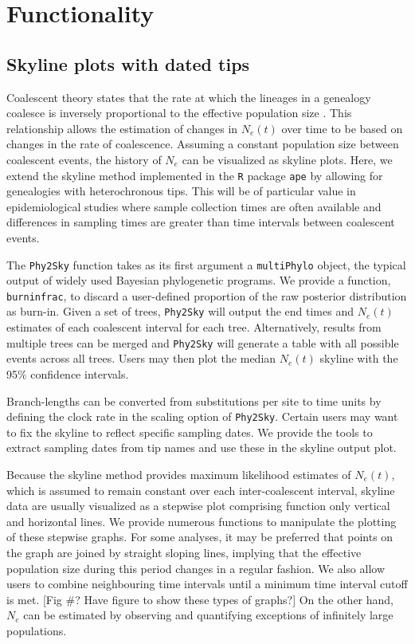 \documentclass[english,titlepage]{article}
\begin{document}
\section*{Functionality}
\subsection*{Skyline plots with dated tips}

Coalescent theory states that the rate at which the lineages in a genealogy coalesce is inversely proportional to the effective population size \citep{Kingman1982} \citep{slatkin_pairwise_1991}. This relationship allows the estimation of changes in $N_e(t)$ over time to be based on changes in the rate of coalescence. Assuming a constant population size between coalescent events, the history of $N_e$ can be visualized as skyline plots. Here, we extend the skyline method implemented in the \texttt{R} package \texttt{ape} \citep{Paradis2004} by allowing for genealogies with heterochronous tips. This will be of particular value in epidemiological studies where sample collection times are often available and differences in sampling times are greater than time intervals between coalescent events. 


The \texttt{Phy2Sky} function takes as its first argument a \texttt{multiPhylo} object, the typical output of widely used Bayesian phylogenetic programs. We provide a function, \texttt{burninfrac}, to discard a user-defined proportion of the raw posterior distribution as burn-in. Given a set of trees, \texttt{Phy2Sky} will output the end times and $N_e(t)$ estimates of each coalescent interval for each tree. Alternatively, results from multiple trees can be merged and \texttt{Phy2Sky} will generate a table with all possible events across all trees. Users may then plot the median $N_e(t)$ skyline with the 95\% confidence intervals.

Branch-lengths can be converted from substitutions per site to time units by defining the clock rate in the scaling option of \texttt{Phy2Sky}. Certain users may want to fix the skyline to reflect specific sampling dates. We provide the tools to extract sampling dates from tip names and use these in the skyline output plot.

Because the skyline method provides maximum likelihood estimates of $N_e(t)$, which is assumed to remain constant over each inter-coalescent interval, skyline data are usually visualized as a stepwise plot comprising function only vertical and horizontal lines. We provide numerous functions to manipulate the plotting of these stepwise graphs. For some analyses, it may be preferred that points on the graph are joined by straight sloping lines, implying that the effective population size during this period changes in a regular fashion. We also allow users to combine neighbouring time intervals until a minimum time interval cutoff is met. [Fig \#? Have figure to show these types of graphs?] On the other hand, $N_e$ can be estimated by observing and quantifying exceptions of infinitely large populations. 
\end{document}
